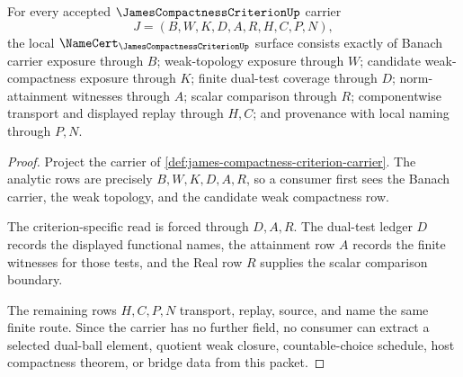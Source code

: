 \begin{theorem}
\label{thm:james-compactness-criterion-namecert-obligations}
For every accepted $\JamesCompactnessCriterionUp$ carrier
$$
J=(B,W,K,D,A,R,H,C,P,N),
$$
the local $\NameCert_{\JamesCompactnessCriterionUp}$ surface consists exactly of Banach carrier exposure through $B$; weak-topology exposure through $W$; candidate weak-compactness exposure through $K$; finite dual-test coverage through $D$; norm-attainment witnesses through $A$; scalar comparison through $R$; componentwise transport and displayed replay through $H,C$; and provenance with local naming through $P,N$.
\end{theorem}
\begin{proof}
Project the carrier of \autoref{def:james-compactness-criterion-carrier}. The analytic rows are precisely $B,W,K,D,A,R$, so a consumer first sees the Banach carrier, the weak topology, and the candidate weak compactness row.

The criterion-specific read is forced through $D,A,R$. The dual-test ledger $D$ records the displayed functional names, the attainment row $A$ records the finite witnesses for those tests, and the Real row $R$ supplies the scalar comparison boundary.

The remaining rows $H,C,P,N$ transport, replay, source, and name the same finite route. Since the carrier has no further field, no consumer can extract a selected dual-ball element, quotient weak closure, countable-choice schedule, host compactness theorem, or bridge data from this packet.
\end{proof}

